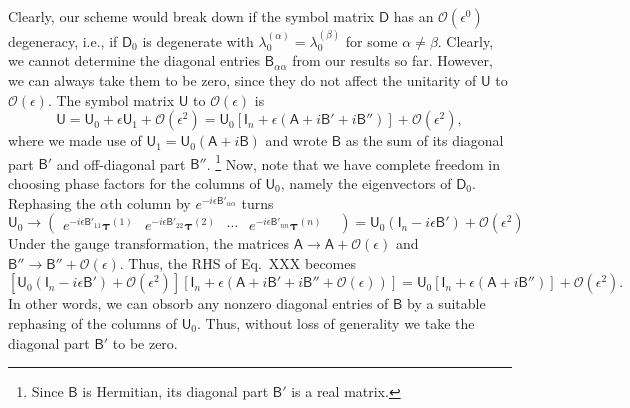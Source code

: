 Clearly, our scheme would break down if the symbol matrix $\mathsf{D}$ has an $\mathcal{O}(\epsilon^{0})$ degeneracy, i.e., if $\mathsf{D}_{0}$ is degenerate with $\lambda_{0}^{(\alpha)} = \lambda_{0}^{(\beta)}$ for some $\alpha \neq \beta$.
Clearly, we cannot determine the diagonal entries $\mathsf{B}_{\alpha\alpha}$ from our results so far.
However, we can always take them to be zero, since they do not affect the unitarity of $\mathsf{U}$ to $\mathcal{O}(\epsilon)$.
The symbol matrix $\mathsf{U}$ to $\mathcal{O}(\epsilon)$ is
%
\begin{equation}
  \mathsf{U} = \mathsf{U}_{0} + \epsilon \mathsf{U}_{1} + \mathcal{O}(\epsilon^{2}) = \mathsf{U}_{0}\left[\mathsf{I}_{n} + \epsilon\left(\mathsf{A} + i\mathsf{B}' + i\mathsf{B}'' \right)\right] + \mathcal{O}(\epsilon^{2}),
\end{equation}
%
where we made use of $\mathsf{U}_{1} = \mathsf{U}_{0}(\mathsf{A} + i\mathsf{B})$ and wrote $\mathsf{B}$ as the sum of its diagonal part $\mathsf{B}'$ and off-diagonal part $\mathsf{B}''$.%
\footnote{Since $\mathsf{B}$ is Hermitian, its diagonal part $\mathsf{B}'$ is a real matrix.}
Now, note that we have complete freedom in choosing phase factors for the columns of $\mathsf{U}_{0}$, namely the eigenvectors of $\mathsf{D}_{0}$.
Rephasing the $\alpha$th column by $e^{-i\epsilon\mathsf{B}'_{\alpha\alpha}}$ turns
%
\begin{equation}
    \mathsf{U}_{0} \to
      \begin{pmatrix}
        e^{-i\epsilon\mathsf{B}'_{11}}\bm{\tau}^{(1)} &
        e^{-i\epsilon\mathsf{B}'_{22}}\bm{\tau}^{(2)} &
        \cdots &
        e^{-i\epsilon\mathsf{B}'_{nn}}\bm{\tau}^{(n)} &
      \end{pmatrix}
      = \mathsf{U}_{0}(\mathsf{I}_{n} - i\epsilon\mathsf{B}') + \mathcal{O}(\epsilon^{2})
\end{equation}
%
Under the gauge transformation, the matrices $\mathsf{A} \to \mathsf{A} + \mathcal{O}(\epsilon)$ and $\mathsf{B}'' \to \mathsf{B}'' + \mathcal{O}(\epsilon)$.
Thus, the RHS of Eq.~XXX becomes
%
\begin{equation}
  \left[\mathsf{U}_{0}(\mathsf{I}_{n} - i\epsilon\mathsf{B}') + \mathcal{O}(\epsilon^{2})\right]\left[\mathsf{I}_{n} + \epsilon\left(\mathsf{A} + i\mathsf{B}' + i\mathsf{B}'' + \mathcal{O}(\epsilon)\right)\right]
  =
  \mathsf{U}_{0}\left[\mathsf{I}_{n} + \epsilon\left(\mathsf{A} + i\mathsf{B}'' \right)\right] + \mathcal{O}(\epsilon^{2}).
\end{equation}
%
In other words, we can obsorb any nonzero diagonal entries of $\mathsf{B}$ by a suitable rephasing of the columns of $\mathsf{U}_{0}$.
Thus, without loss of generality we take the diagonal part $\mathsf{B}'$ to be zero.

